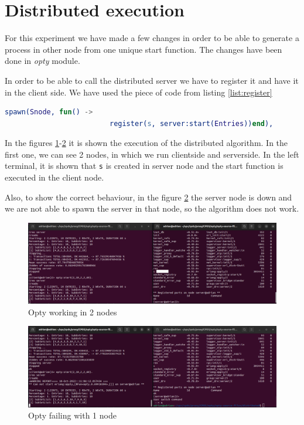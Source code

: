 \documentclass[a4paper, 10pt]{article}
\begin{document}
\section{Distributed execution}

For this experiment we have made a few changes in order to be able to generate a process in other node from one unique start function. The changes have been done in \textit{opty} module. 

In order to be able to call the distributed server we have to register it and have it in the client side. We have used the piece of code from listing \ref{list:register}


\begin{minipage}{\textwidth}
	\begin{lstlisting}[language=erlang, caption={Register Distributed Server}]
    spawn(Snode, fun() -> 
                         register(s, server:start(Entries))end),
 	\end{lstlisting}
  \label{list:register}
    \end{minipage}

In the figures \ref{fig:2nodes}-\ref{fig:1node} it is shown the execution of the distributed algorithm. In the first one, we can see 2 nodes, in which we run clientside and serverside. In the left terminal, it is shown that \texttt{s} is created in server node and the start function is executed in the client node. 

Also, to show the correct behaviour, in the figure \ref{fig:1node} the server node is down and we are not able to spawn the server in that node, so the algorithm does not work.



\begin{figure}[H]
  \centering
  \includegraphics[width=0.95\linewidth]{images/optyWorking.png}
    \caption{Opty working in 2 nodes}
    \label{fig:2nodes}
\end{figure} 


\begin{figure}[H]
  \centering
  \includegraphics[width=0.95\linewidth]{images/opty1node.png}
    \caption{Opty failing with 1 node}
    \label{fig:1node}
\end{figure} 
\end{document}
